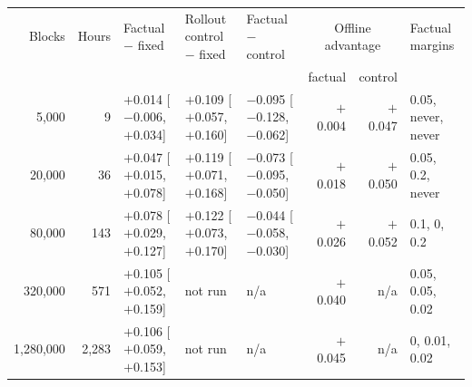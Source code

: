\begin{tabular}{rrlllrrl}
\toprule
Blocks & Hours & Factual $-$ fixed & Rollout control $-$ fixed & Factual $-$ control & \multicolumn{2}{c}{Offline advantage} & Factual margins \\
 & & & & & factual & control & \\
\midrule
5{,}000 & 9 & $+$0.014 [$-$0.006, $+$0.034] & $+$0.109 [$+$0.057, $+$0.160] & $-$0.095 [$-$0.128, $-$0.062] & $+$0.004 & $+$0.047 & 0.05, never, never \\
20{,}000 & 36 & $+$0.047 [$+$0.015, $+$0.078] & $+$0.119 [$+$0.071, $+$0.168] & $-$0.073 [$-$0.095, $-$0.050] & $+$0.018 & $+$0.050 & 0.05, 0.2, never \\
80{,}000 & 143 & $+$0.078 [$+$0.029, $+$0.127] & $+$0.122 [$+$0.073, $+$0.170] & $-$0.044 [$-$0.058, $-$0.030] & $+$0.026 & $+$0.052 & 0.1, 0, 0.2 \\
320{,}000 & 571 & $+$0.105 [$+$0.052, $+$0.159] & not run & n/a & $+$0.040 & n/a & 0.05, 0.05, 0.02 \\
1{,}280{,}000 & 2{,}283 & $+$0.106 [$+$0.059, $+$0.153] & not run & n/a & $+$0.045 & n/a & 0, 0.01, 0.02 \\
\bottomrule
\end{tabular}
